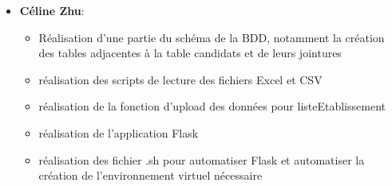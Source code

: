 \begin{itemize}
\begin{itemize}[label=$\bullet$]
          \end{itemize}    
          \item \textbf{Céline Zhu}: 
                \begin{itemize}[label=$\bullet$] 
              \item Réalisation d'une partie du schéma de la BDD, notamment la création des tables adjacentes à la table candidats et de leurs jointures
              \item réalisation des scripts de lecture des fichiers Excel et CSV
              \item réalisation de la fonction d'upload des données pour listeEtablissement
              \item réalisation de l'application Flask
              \item réalisation des fichier .sh pour automatiser Flask et automatiser la création de l'environnement virtuel nécessaire
          \end{itemize}
      \end{itemize}
      
      
      